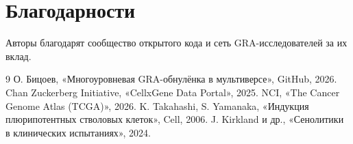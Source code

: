 \documentclass[12pt,a4paper]{article}
\begin{document}
\section*{Благодарности}
Авторы благодарят сообщество открытого кода и сеть GRA-исследователей за их вклад.

\begin{thebibliography}{9}
 О. Бицоев, «Многоуровневая GRA-обнулёнка в мультиверсе», GitHub, 2026.
 Chan Zuckerberg Initiative, «CellxGene Data Portal», 2025.
 NCI, «The Cancer Genome Atlas (TCGA)», 2026.
 K. Takahashi, S. Yamanaka, «Индукция плюрипотентных стволовых клеток», Cell, 2006.
 J. Kirkland и др., «Сенолитики в клинических испытаниях», 2024.
\end{thebibliography}
\end{document}
